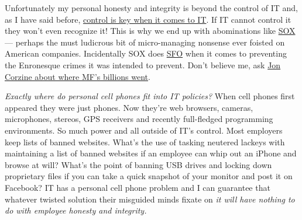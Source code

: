Unfortunately my personal honesty and integrity is beyond the control of
IT and, as I have said before,
\href{http://bakerjd99.wordpress.com/2010/06/11/the-real-problem-with-enterprise-software/}{control
is key when it comes to IT}. If IT cannot control it they won't even
recognize it! This is why we end up with abominations like
\href{http://www.infoworld.com/d/developer-world/sarbanes-oxley-seen-biggest-it-time-waster-481}{SOX}
--- perhaps the must ludicrous bit of micro-managing nonsense ever
foisted on American companies. Incidentally SOX does
\href{http://www.urbandictionary.com/define.php?term=sweet\%20fuck\%20all}{SFO}
when it comes to preventing the Enronesque crimes it was intended to
prevent. Don't believe me, ask
\href{http://technorati.com/business/article/jon-corzine-to-be-hoisted-by/}{Jon
Corzine about where MF's billions went}.

\emph{Exactly where do personal cell phones fit into IT policies?} When
cell phones first appeared they were just phones. Now they're web
browsers, cameras, microphones, stereos, GPS receivers and recently
full-fledged programming environments. So much power and all outside of
IT's control. Most employers keep lists of banned websites. What's the
use of tasking neutered lackeys with maintaining a list of banned
websites if an employee can whip out an iPhone and browse at will?
What's the point of banning USB drives and locking down proprietary
files if you can take a quick snapshot of your monitor and post it on
Facebook? IT has a personal cell phone problem and I can guarantee that
whatever twisted solution their misguided minds fixate on \emph{it will
have nothing to do with employee honesty and integrity.}




%